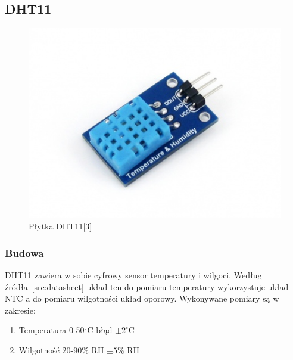 \documentclass{article}
\begin{document}
        \subsection{DHT11}
            \begin{figure}[ht]
                \centering
                \includegraphics[width=\textwidth]{images/450px-Temperature-Humidity-Sensor_l.jpg}
                \caption{Płytka DHT11[3]}
                \label{fig:DHT11}
            \end{figure}
            \FloatBarrier
            \subsubsection{Budowa}
                DHT11 zawiera w sobie cyfrowy sensor temperatury i wilgoci. Według \hyperref[src:datasheet]{źródła~\ref*{src:datasheet}}
                układ ten do pomiaru temperatury wykorzystuje układ NTC a do pomiaru wilgotności
                układ oporowy. Wykonywane pomiary są w zakresie:
                \begin{enumerate}
                    \item Temperatura 0-50\(^\circ\text{C}\) błąd \(\pm 2^\circ\text{C}\)
                    \item Wilgotność 20-90\% RH \(\pm 5\%\text{ RH}\)
                \end{enumerate}
\end{document}
